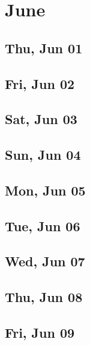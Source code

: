 \chapter{June}
	\section{Thu, Jun 01}
		
		
	\section{Fri, Jun 02}
		
		
	\section{Sat, Jun 03}
		
		
	\section{Sun, Jun 04}
		
		
	\section{Mon, Jun 05}
		
		
	\section{Tue, Jun 06}
		
		
	\section{Wed, Jun 07}
		
		
	\section{Thu, Jun 08}
		
		
	\section{Fri, Jun 09}
		
		
